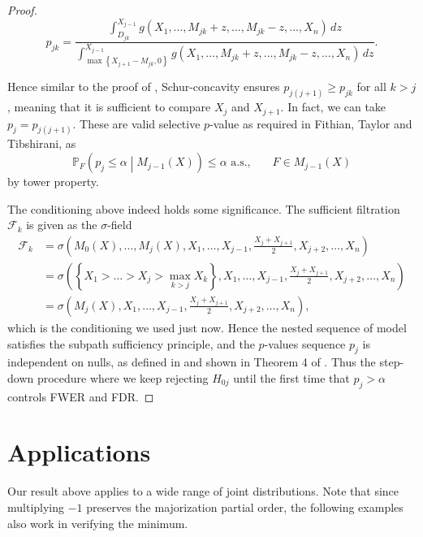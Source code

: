 \documentclass[11pt]{article}
\newcommand{\PP}{\mathbb{P}}
\begin{document}
\begin{proof}
$$p_{jk} = \frac{\int_{D_{jk}}^{X_{j-1}} g\left(X_1, \ldots, M_{jk} + z, \ldots, M_{jk} - z, \ldots, X_n\right) \,dz}{\int_{\max\left\{X_{j+1} - M_{jk}, 0\right\}}^{X_{j-1}} g\left(X_1, \ldots, M_{jk} + z, \ldots, M_{jk} - z, \ldots, X_n\right) \,dz}.$$

Hence similar to the proof of , Schur-concavity ensures $p_{j\left(j+1\right)} \ge p_{jk}$ for all $k>j$, meaning that it is sufficient to compare $X_j$ and $X_{j+1}$. In fact, we can take $p_j = p_{j\left(j+1\right)}$. These are valid selective $p$-value as required in Fithian, Taylor and Tibshirani, as
$$\PP_F \left(p_j \le \alpha \middle| M_{j-1}\left(X\right)\right) \le \alpha \text{ a.s.}, ~~~~~~~~ F \in M_{j-1}\left(X\right)$$
by tower property.

The conditioning above indeed holds some significance. The sufficient filtration \cite{Fithian:2015uj} $\mathcal{F}_k$ is given as the $\sigma$-field
\begin{align*}
\mathscr{F}_k & = \sigma\left(M_0\left(X\right), \ldots, M_j\left(X\right), X_1, \ldots, X_{j-1}, \frac{X_j + X_{j+1}}{2}, X_{j+2}, \ldots, X_n\right) \\
& = \sigma\left(\left\{X_1 > \ldots > X_j > \max_{k>j} X_k\right\}, X_1, \ldots, X_{j-1}, \frac{X_j + X_{j+1}}{2}, X_{j+2}, \ldots, X_n\right) \\
& = \sigma\left(M_j\left(X\right), X_1, \ldots, X_{j-1}, \frac{X_j + X_{j+1}}{2}, X_{j+2}, \ldots, X_n\right),
\end{align*}
which is the conditioning we used just now. Hence the nested sequence of model satisfies the subpath sufficiency principle, and the $p$-values sequence $p_j$ is independent on nulls, as defined in and shown in Theorem 4 of \cite{Fithian:2015uj}. Thus the step-down procedure where we keep rejecting $H_{0j}$ until the first time that $p_j > \alpha$ controls FWER and FDR.

\end{proof}

\section{Applications}
\label{sec:applications}

Our result above applies to a wide range of joint distributions. Note that since multiplying $-1$ preserves the majorization partial order, the following examples also work in verifying the minimum.
\end{document}
